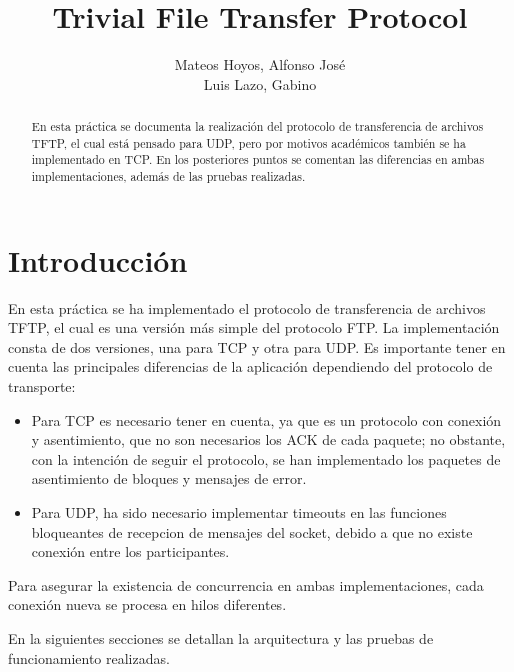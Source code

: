 \documentclass[journal, a4paper]{IEEEtran}
\begin{document}
	\title{Trivial File Transfer Protocol}
	\author{Mateos Hoyos, Alfonso José \\ Luis Lazo, Gabino}
	\maketitle

\begin{abstract}
	En esta práctica se documenta la realización del protocolo de transferencia de archivos TFTP, el cual está pensado para UDP, pero por motivos académicos también se ha implementado en TCP. En los posteriores puntos se comentan las diferencias en ambas implementaciones, además de las pruebas realizadas.
\end{abstract}

\section{Introducción}
	En esta práctica se ha implementado el protocolo de transferencia de archivos TFTP, el cual es una versión más simple del protocolo FTP. La implementación consta de dos versiones, una para TCP y otra para UDP. Es importante tener en cuenta las principales diferencias de la aplicación dependiendo del protocolo de transporte:
\begin{itemize}
\item Para TCP es necesario tener en cuenta, ya que es un protocolo con conexión y asentimiento, que no son necesarios los ACK de cada paquete; no obstante, con la intención de seguir el protocolo, se han implementado los paquetes de asentimiento de bloques y mensajes de error.
\item Para UDP, ha sido necesario implementar timeouts en las funciones bloqueantes de recepcion de mensajes del socket, debido a que no existe conexión entre los participantes.
\end{itemize}	

Para asegurar la existencia de concurrencia en ambas implementaciones, cada conexión nueva se procesa en hilos diferentes.

En la siguientes secciones se detallan la arquitectura y las pruebas de funcionamiento realizadas.
\end{document}
